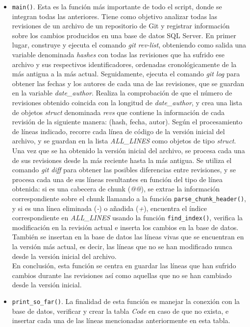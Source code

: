 \documentclass[a4paper, 12pt]{book}
\begin{document}
\begin{itemize}
  \item \texttt{main()}. Esta es la función más importante de todo el script, donde se integran todas las anteriores. Tiene como objetivo analizar todas las revisiones de un archivo de un repositorio de Git y registrar información sobre los cambios producidos en una base de datos SQL Server. En primer lugar, construye y ejecuta
  el comando \textit{git rev-list}, obteniendo como salida una variable denominada \textit{hashes} con todas las revisiones que ha sufrido ese archivo y sus respectivos identificadores, ordenadas cronológicamente de la más antigua a la más actual. Seguidamente, ejecuta el comando \textit{git log} para obtener las fechas y los autores
  de cada una de las revisiones, que se guardan en la variable \textit{date\_author}. Realiza la comprobación de que el número de revisiones obtenido coincida con la longitud de \textit{date\_author}, y crea una lista de objetos \textit{struct} denominada \textit{revs} que contiene la información de cada revisión de la siguiente manera:
   (hash, fecha, autor). Según el procesamiento de líneas indicado, recorre cada línea de código de la versión inicial del archivo, y se guardan en la lista \textit{ALL\_LINES} como objetos de tipo \textit{struct}.
   \\Una vez que se ha obtenido la versión inicial del archivo, se procesa cada una de sus revisiones desde la más reciente hasta la más antigua. Se utiliza el comando \textit{git diff} para obtener las posibles diferencias entre revisiones, y se procesa cada una de sus líneas resultantes en función del tipo de línea obtenida: si es una
   cabecera de chunk (\textit{@@}), se extrae la información correspondiente sobre el chunk llamando a la función \texttt{parse\_chunk\_header()}, y si es una línea eliminada (\textit{-}) o añadida (\textit{+}), encuentra el índice correspondiente en \textit{ALL\_LINES} usando la función \texttt{find\_index()}, verifica la modificación
    en la revisión actual e inserta los cambios en la base de datos. También se insertan en la base de datos las líneas vivas que se encuentran en la versión más actual, es decir, las líneas que no se han modificado nunca desde la versión inicial del archivo.
    \\En conclusión, esta función se centra en guardar las líneas que han sufrido cambios durante las revisiones así como aquellas que no se han cambiado desde la versión inicial.

  \item \texttt{print\_so\_far()}. La finalidad de esta función es manejar la conexión con la base de datos, verificar y crear la tabla \textit{Code} en caso de que no exista, e insertar cada una de las líneas mencionadas anteriormente en esta tabla.
\end{itemize}
\end{document}
